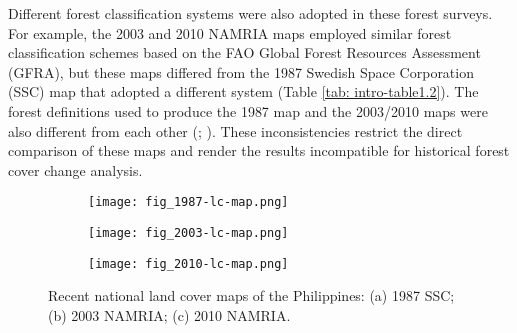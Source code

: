 Different forest classification systems were also adopted in these forest surveys. For example, the 2003 and 2010 NAMRIA maps employed similar forest classification schemes based on the FAO Global Forest Resources Assessment (GFRA), but these maps differed from the 1987 Swedish Space Corporation (SSC) map that adopted a different system (Table \ref{tab: intro-table1.2}). The forest definitions used to produce the 1987 map and the 2003/2010 maps were also different from each other (\cite{swedish_space_corporation_mapping_1988}; \cite{fao_2010_2010}). These inconsistencies restrict the direct comparison of these maps and render the results incompatible for historical forest cover change analysis.\\

\begin{figure}[!ht] \centering
	\captionsetup[subfigure]{width=2.0in} %
	\begin{subfigure}[t]{0.32\textwidth}
		\texttt{[image: fig\_1987-lc-map.png]}
		\caption[SSC/NAMRIA land cover maps.]{}
		\label{fig: intro-fig1.1a}
	\end{subfigure}
	\begin{subfigure}[t]{0.32\textwidth}
		\texttt{[image: fig\_2003-lc-map.png]}
		\caption[SSC/NAMRIA land cover maps.]{}
		\label{fig: intro-fig1.1b}
	\end{subfigure}
	\begin{subfigure}[t]{0.32\textwidth}
		\texttt{[image: fig\_2010-lc-map.png]}
		\caption[SSC/NAMRIA land cover maps.]{}
		\label{fig: intro-fig1.1c}
	\end{subfigure}
	\caption[Recent national land cover maps of the Philippines: (a) 1987 SSC; (b) 2003 NAMRIA; (c) 2010 NAMRIA.]{Recent national land cover maps of the Philippines: (a) 1987 SSC; (b) 2003 NAMRIA; (c) 2010 NAMRIA.}
	\label{fig: intro-fig1.1}
\end{figure}

